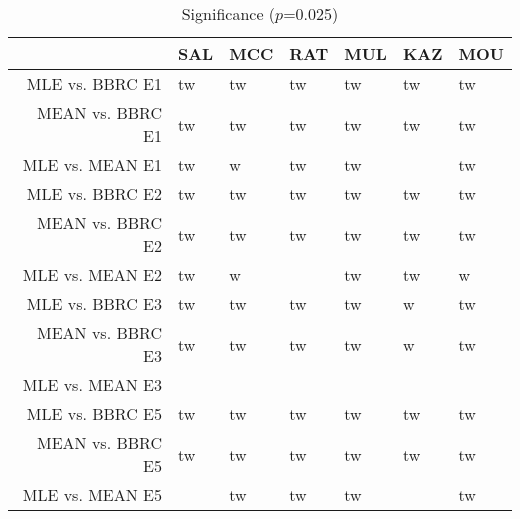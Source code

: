\begin{table}[t]
\begin{center}
\begin{tabular}{rllllll}
  \hline
 & SAL & MCC & RAT & MUL & KAZ & MOU \\ 
  \hline
MLE vs. BBRC E1 & tw & tw & tw & tw & tw & tw \\ 
  MEAN vs. BBRC E1 & tw & tw & tw & tw & tw & tw \\ 
  MLE vs. MEAN E1 & tw & w & tw & tw &  & tw \\ 
  MLE vs. BBRC E2 & tw & tw & tw & tw & tw & tw \\ 
  MEAN vs. BBRC E2 & tw & tw & tw & tw & tw & tw \\ 
  MLE vs. MEAN E2 & tw & w &  & tw & tw & w \\ 
  MLE vs. BBRC E3 & tw & tw & tw & tw & w & tw \\ 
  MEAN vs. BBRC E3 & tw & tw & tw & tw & w & tw \\ 
  MLE vs. MEAN E3 &  &  &  &  &  &  \\ 
  MLE vs. BBRC E5 & tw & tw & tw & tw & tw & tw \\ 
  MEAN vs. BBRC E5 & tw & tw & tw & tw & tw & tw \\ 
  MLE vs. MEAN E5 &  & tw & tw & tw &  & tw \\ 
   \hline
\end{tabular}
\caption{Significance ($p$=0.025)}
\label{t:sign}
\end{center}
\end{table}
